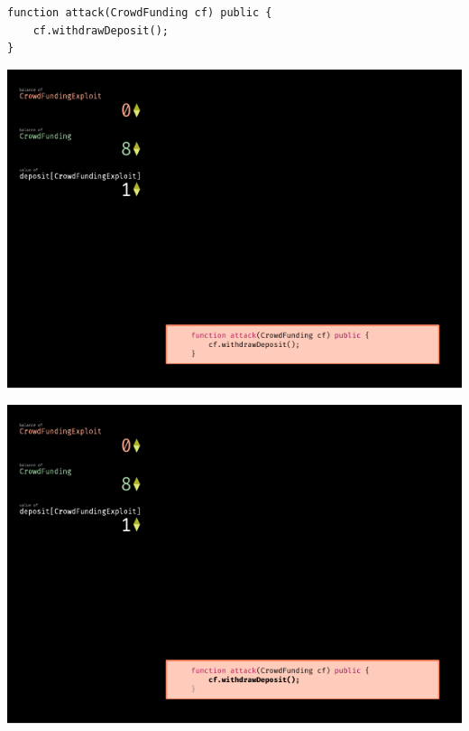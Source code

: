 \documentclass[xcolor=x11names,compress]{beamer}
\begin{document}
\begin{frame}[fragile]
\begin{overprint}
\begin{minipage}[c][0.7\textheight][c]{\textwidth}
\begin{verbatim}
function attack(CrowdFunding cf) public {
    cf.withdrawDeposit();
} 
    \end{verbatim}
		\end{minipage}
		\begin{center}
			\includegraphics[width=\textwidth,height=0.8\textheight,keepaspectratio]{img/reentrancy/01.pdf}
		\end{center}
		\begin{center}
			\includegraphics[width=\textwidth,height=0.8\textheight,keepaspectratio]{img/reentrancy/02.pdf}
		\end{center}
		\begin{center}

\end{center}
\end{overprint}
\end{frame}
\end{document}
